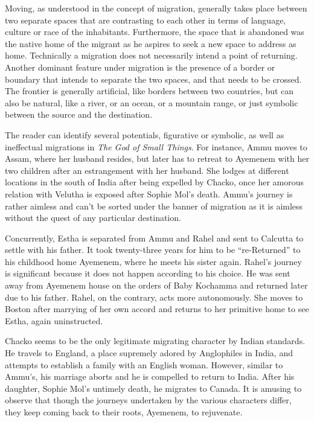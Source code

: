 Moving, as understood in the concept of migration, generally takes place between two separate spaces that are contrasting to each other in terms of language, culture or race of the inhabitants. Furthermore, the space that is abandoned was the native home of the migrant as he aspires to seek a new space to address as home. Technically a migration does not necessarily intend a point of returning. Another dominant feature under migration is the presence of a border or boundary that intends to separate the two spaces, and that needs to be crossed. The frontier is generally artificial, like borders between two countries, but can also be natural, like a river, or an ocean, or a mountain range, or just symbolic between the source and the destination. 

The reader can identify several potentials, figurative or symbolic, as well as ineffectual migrations in \emph{The God of Small Things}. For instance, Ammu moves to Assam, where her husband resides, but later has to retreat to Ayemenem with her two children after an estrangement with her husband. She lodges at different locations in the south of India after being expelled by Chacko, once her amorous relation with Velutha is exposed after Sophie Mol's death. Ammu's journey is rather aimless and can't be sorted under the banner of migration as it is aimless without the quest of any particular destination. 

Concurrently, Estha is separated from Ammu and Rahel and sent to Calcutta to settle with his father. It took twenty-three years for him to be ``re-Returned'' \parencite[9]{Roy1997} to his childhood home Ayemenem, where he meets his sister again. Rahel's journey is significant because it does not happen according to his choice. He was sent away from Ayemenem house on the orders of Baby Kochamma and returned later due to his father. Rahel, on the contrary, acts more autonomously. She moves to Boston after marrying of her own accord and returns to her primitive home to see Estha, again uninstructed. 

Chacko seems to be the only legitimate migrating character by Indian standards. He travels to England, a place supremely adored by Anglophiles in India, and attempts to establish a family with an English woman. However, similar to Ammu's, his marriage aborts and he is compelled to return to India. After his daughter, Sophie Mol's untimely death, he migrates to Canada. It is amusing to observe that though the journeys undertaken by the various characters differ, they keep coming back to their roots, Ayemenem, to rejuvenate.

